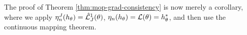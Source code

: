 The proof of Theorem \ref{thm:mop-grad-consistency} is now merely a corollary, where we apply $\eta_n^J (h_\theta) = \hat{\mathcal{L}}^1_J(\theta)$, $\eta_n(h_\theta) = \mathcal{L}(\theta) = h_\theta^*$, and then use the continuous mapping theorem. 







    
